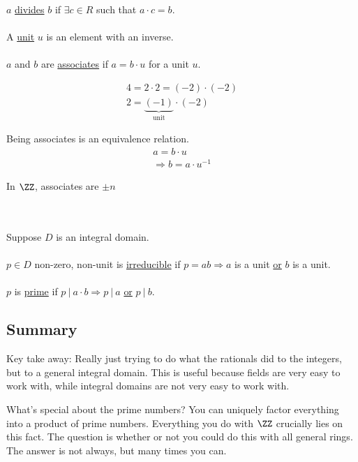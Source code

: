 \documentclass[class=scrartcl, crop=false]{standalone}
\begin{document}
\begin{definition}
  $a$ \ul{divides} $b$ if $\exists c \in R$ such that $a \cdot c = b$.
  \\\\
  A \ul{unit} $u$ is an element with an inverse.
  \\\\
  $a$ and $b$ are \ul{associates} if $a = b \cdot u$ for a unit $u$.
\end{definition} 

\begin{example}
  \begin{gather*}
    4 = 2 \cdot 2 = (-2) \cdot (-2) \\
    2 = \underbrace{(-1)}_{\text{unit}} \cdot (-2)
  \end{gather*} 
\end{example} 

\begin{note}
  Being associates is an equivalence relation.
  \begin{gather*}
    a = b \cdot u \\
    \Rightarrow b = a \cdot u^{-1}
  \end{gather*} 
\end{note} 

\begin{example}
  In $\ZZ$, associates are $\pm n$
\end{example} 

\begin{definition} \leavevmode \\\\
  Suppose $D$ is an integral domain.
  \\\\
  $p \in D$ non-zero, non-unit is \ul{irreducible} if $p = ab \Rightarrow a$ is a unit \ul{or} $b$ is a unit.
  \\\\
  $p$ is \ul{prime} if $p \ | \ a \cdot b \Rightarrow p \ | \ a$  \ul{or} $p \ | \ b$.
  
\end{definition} 


\subsection{Summary}
Key take away: Really just trying to do what the rationals did to the integers, but to a general integral domain. This is useful because fields are very easy to work with, while integral domains are not very easy to work with.

What's special about the prime numbers? You can uniquely factor everything into a product of prime numbers. Everything you do with $\ZZ$ crucially lies on this fact. The question is whether or not you could do this with all general rings. The answer is not always, but many times you can.
\end{document}
